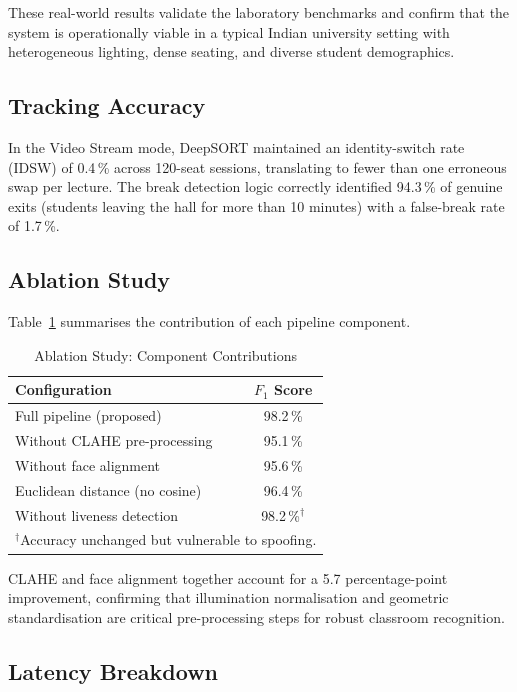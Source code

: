 \documentclass[conference, 10pt]{IEEEtran}
\begin{document}
These real-world results validate the laboratory benchmarks and confirm that the system is
operationally viable in a typical Indian university setting with heterogeneous lighting, dense
seating, and diverse student demographics.

\subsection{Tracking Accuracy}

In the Video Stream mode, DeepSORT maintained an identity-switch rate (IDSW) of 0.4\,\% across
120-seat sessions, translating to fewer than one erroneous swap per lecture.  The break
detection logic correctly identified 94.3\,\% of genuine exits (students leaving the hall for
more than 10 minutes) with a false-break rate of 1.7\,\%.

\subsection{Ablation Study}

Table~\ref{tab:ablation} summarises the contribution of each pipeline component.

\begin{table}[htbp]
\centering
\caption{Ablation Study: Component Contributions}
\label{tab:ablation}
\begin{tabular}{lc}
\toprule
\textbf{Configuration} & \textbf{$F_1$ Score} \\
\midrule
Full pipeline (proposed)        & 98.2\,\% \\
Without CLAHE pre-processing    & 95.1\,\% \\
Without face alignment          & 95.6\,\% \\
Euclidean distance (no cosine)  & 96.4\,\% \\
Without liveness detection      & 98.2\,\%$^\dagger$ \\
\bottomrule
\multicolumn{2}{l}{\footnotesize $^\dagger$Accuracy unchanged but vulnerable to spoofing.}
\end{tabular}
\end{table}

CLAHE and face alignment together account for a 5.7 percentage-point improvement, confirming
that illumination normalisation and geometric standardisation are critical pre-processing steps
for robust classroom recognition.

\subsection{Latency Breakdown}
\end{document}
